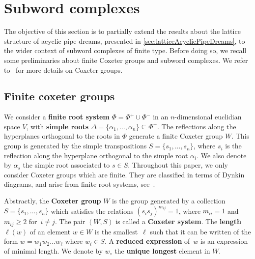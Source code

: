 \documentclass{amsart}
\theoremstyle{definition}
\newcommand{\defn}[1]{\textbf{\textsf{\color{PineGreen} #1}}} %
\newcommand{\cesar}[1]{\todo[color=orange!30,inline]{#1 \\ \hfill --- C.}}
\newcommand{\wo}{w_\circ} %
\begin{document}

\newpage
\section{Subword complexes}

The objective of this section is to partially extend the results about the lattice structure of acyclic pipe dreams, presented in \cref{sec:latticeAcyclicPipeDreams}, to the wider context of subword complexes of finite type.
Before doing so, we recall some preliminaries about finite Coxeter groups and subword complexes.
We refer to~\cite{BjornerBrenti, Humphreys} for more details on Coxeter groups. 


\subsection{Finite coxeter groups} 
We consider a \defn{finite root system} $\Phi=\Phi^+\cup \Phi^-$ in an $n$-dimensional euclidian space $V$, with \defn{simple roots} $\Delta=\{\alpha_1,\dots,\alpha_n\} \subseteq \Phi^+$.
The reflections along the hyperplanes orthogonal to the roots in $\Phi$ generate a finite Coxeter group $W$. 
This group is generated by the simple transpositions $S=\{s_1,\dots ,s_n\}$, where $s_i$ is the reflection along the hyperplane orthogonal to the simple root $\alpha_i$.
We also denote by $\alpha_s$ the simple root associated to $s\in S$.
Throughout this paper, we only consider Coxeter groups which are finite.
They are classified in terms of Dynkin diagrams, and arise from finite root systems, see~\cite{Humphreys}. 

Abstractly, the \defn{Coxeter group} $W$ is the group generated by a collection $S=\{s_1,\dots, s_n\}$ which satisfies the relations $(s_is_j)^{m_{ij}}=1$, where $m_{ii}=1$ and $m_{ij}\geq 2$ for~$i\neq j$.
The pair $(W,S)$ is called a \defn{Coxeter system}.
The \defn{length} $\ell(w)$ of an element $w\in W$ is the smallest~$\ell$ such that it can be written of the form $w=w_1w_2\dots w_\ell$ where $w_i\in S$.
A \defn{reduced expression} of~$w$ is an expression of minimal length.
We denote by $\wo$ the \defn{unique longest} element in $W$.
\end{document}
